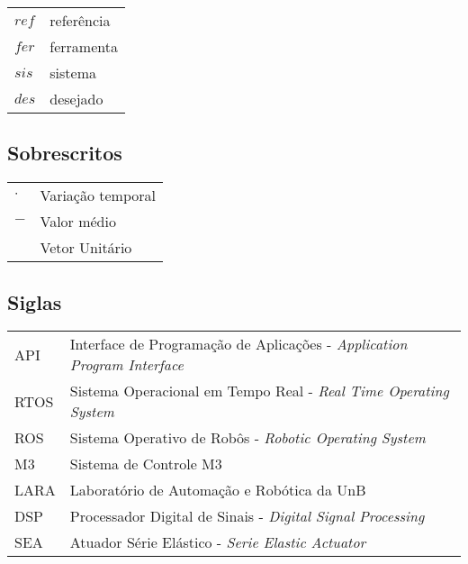 \begin{tabular}{p{}p{}}
$ref$  & referência \tabularnewline
$fer$  & ferramenta \tabularnewline
$sis$  & sistema \tabularnewline
$des$  & desejado\tabularnewline
\end{tabular}


\subsection*{Sobrescritos}

\begin{tabular}{p{}p{}}
$\cdot$  & Variação temporal \tabularnewline
$-$  & Valor médio \tabularnewline
$^{}$  & Vetor Unitário \tabularnewline
\end{tabular}


\subsection*{Siglas}

\begin{tabular}{p{}p{}}
API & Interface de Programação de Aplicações - \textit{Application Program Interface}\tabularnewline
RTOS & Sistema Operacional em Tempo Real -  \textit{Real Time Operating System}\tabularnewline
ROS & Sistema Operativo de Robôs - \textit{Robotic Operating System}\tabularnewline
M3 & Sistema de Controle M3\tabularnewline
LARA & Laboratório de Automação e Robótica da UnB\tabularnewline
DSP & Processador Digital de Sinais - \textit{Digital Signal Processing}\tabularnewline
SEA & Atuador Série Elástico - \textit{Serie Elastic Actuator}\tabularnewline
\end{tabular}
